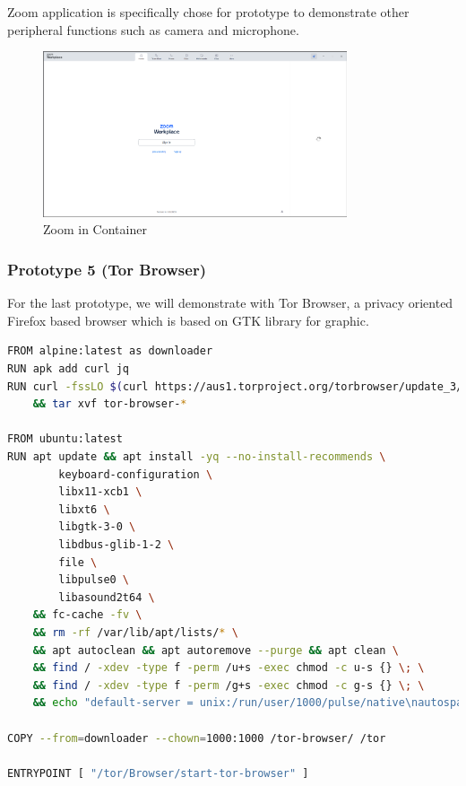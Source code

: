 \documentclass[journal,onecolumn]{IEEEtran}
\begin{document}
Zoom application is specifically chose for prototype to demonstrate other peripheral functions such as camera and microphone.

\begin{figure}[ht]
    \centering
    \includegraphics[width=0.8\textwidth]{proto-zoom}
    \caption{Zoom in Container}
    \label{fig:proto-zoom}
\end{figure}

\subsubsection{Prototype 5 (Tor Browser)}
For the last prototype, we will demonstrate with Tor Browser, a privacy oriented Firefox based browser which is based on GTK library for graphic.

\begin{lstlisting}[language=Bash]
FROM alpine:latest as downloader
RUN apk add curl jq
RUN curl -fssLO $(curl https://aus1.torproject.org/torbrowser/update_3/release/downloads.json | jq -r '.downloads."linux-x86_64".ALL.binary') \
    && tar xvf tor-browser-*

FROM ubuntu:latest
RUN apt update && apt install -yq --no-install-recommends \
        keyboard-configuration \
        libx11-xcb1 \
        libxt6 \
        libgtk-3-0 \
        libdbus-glib-1-2 \
        file \
        libpulse0 \
        libasound2t64 \
    && fc-cache -fv \
    && rm -rf /var/lib/apt/lists/* \
    && apt autoclean && apt autoremove --purge && apt clean \
    && find / -xdev -type f -perm /u+s -exec chmod -c u-s {} \; \
    && find / -xdev -type f -perm /g+s -exec chmod -c g-s {} \; \
    && echo "default-server = unix:/run/user/1000/pulse/native\nautospawn = no\ndaemon-binary = /bin/true\nenable-shm = false" > /etc/pulse/client.conf

COPY --from=downloader --chown=1000:1000 /tor-browser/ /tor

ENTRYPOINT [ "/tor/Browser/start-tor-browser" ]
\end{lstlisting}
\end{document}
